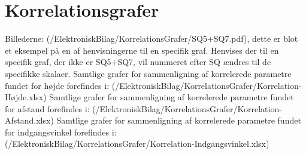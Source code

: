 \section{Korrelationsgrafer}
\label{ElektroniskBilagKorrelationsgrafer}
%

Billederne: (/ElektroniskBilag/KorrelationsGrafer/SQ5+SQ7.pdf), dette er blot et eksempel på en af henvisningerne til en specifik graf. Henvises der til en specifik graf, der ikke er SQ5+SQ7, vil nummeret efter SQ ændres til de specifikke skalaer.\blankline
%
Samtlige grafer for sammenligning af korrelerede parametre fundet for højde forefindes i: (/ElektroniskBilag/KorrelationsGrafer/Korrelation-Højde.xlsx)\blankline
%
Samtlige grafer for sammenligning af korrelerede parametre fundet for afstand forefindes i: (/ElektroniskBilag/KorrelationsGrafer/Korrelation-Afstand.xlsx)\blankline
%
Samtlige grafer for sammenligning af korrelerede parametre fundet for indgangsvinkel forefindes i: (/ElektroniskBilag/KorrelationsGrafer/Korrelation-Indgangsvinkel.xlsx)

